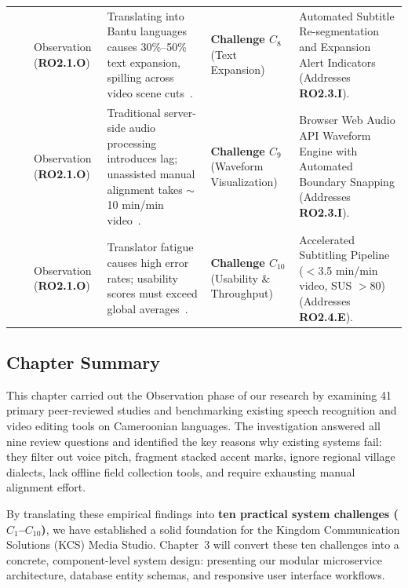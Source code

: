 \documentclass[a4paper,11pt]{article}
\begin{document}
\begin{table}[t]
\begin{tabular}{p{1.1cm} p{1.4cm} >{\raggedright\arraybackslash}p{2.2cm} >{\raggedright\arraybackslash}p{4.2cm} >{\raggedright\arraybackslash}p{2.6cm} >{\raggedright\arraybackslash}p{4.0cm}}
\addlinespace
& & Observation (\textbf{RO2.1.O}) & Translating into Bantu languages causes 30\%--50\% text expansion, spilling across video scene cuts~\cite{essono2000ewondo}. & \textbf{Challenge $C_8$} (Text Expansion) & Automated Subtitle Re-segmentation and Expansion Alert Indicators (Addresses \textbf{RO2.3.I}). \\
\addlinespace
& & Observation (\textbf{RO2.1.O}) & Traditional server-side audio processing introduces lag; unassisted manual alignment takes $\sim$10 min/min video~\cite{w3c2021webaudio}. & \textbf{Challenge $C_9$} (Waveform Visualization) & Browser Web Audio API Waveform Engine with Automated Boundary Snapping (Addresses \textbf{RO2.3.I}). \\
\addlinespace
& & Observation (\textbf{RO2.1.O}) & Translator fatigue causes high error rates; usability scores must exceed global averages~\cite{brooke1996sus, hart1988nasa}. & \textbf{Challenge $C_{10}$} (Usability \& Throughput) & Accelerated Subtitling Pipeline ($<$3.5 min/min video, SUS $>80$) (Addresses \textbf{RO2.4.E}). \\
\bottomrule
\end{tabular}
\end{table}

\subsection{Chapter Summary}
\label{sec:chap2_summary}

This chapter carried out the Observation phase of our research by examining 41 primary peer-reviewed studies and benchmarking existing speech recognition and video editing tools on Cameroonian languages. The investigation answered all nine review questions and identified the key reasons why existing systems fail: they filter out voice pitch, fragment stacked accent marks, ignore regional village dialects, lack offline field collection tools, and require exhausting manual alignment effort.

By translating these empirical findings into \textbf{ten practical system challenges ($C_1$--$C_{10}$)}, we have established a solid foundation for the Kingdom Communication Solutions (KCS) Media Studio. Chapter~3 will convert these ten challenges into a concrete, component-level system design: presenting our modular microservice architecture, database entity schemas, and responsive user interface workflows.

\FloatBarrier
\clearpage
\onecolumn
\end{document}
